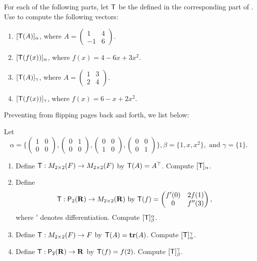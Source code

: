 \begin{exercise} \label{exercise 2.3.4}
For each of the following parts, let \(\textsf{T}\) be the \LTRAN{} defined in the corresponding part of .
Use  to compute the following vectors:

\begin{enumerate}
\item \([\textsf{T}(A)]_{\alpha}\), where \(A = \begin{pmatrix} 1 & 4 \\ -1 & 6 \end{pmatrix}\).
\item \([\textsf{T}(f(x))]_{\alpha}\), where \(f(x) = 4 - 6x + 3x^2\).
\item \([\textsf{T}(A)]_{\gamma}\), where \(A = \begin{pmatrix} 1 & 3 \\ 2 & 4 \end{pmatrix}\).
\item \([\textsf{T}(f(x))]_{\gamma}\), where \(f(x) = 6 - x + 2x^2\).
\end{enumerate}

\end{exercise}

\begin{note}
Preventing from flipping pages back and forth, we list  below:

Let
\[
    \alpha = \bigg\{
                \begin{pmatrix} 1 & 0 \\ 0 & 0 \end{pmatrix},
                \begin{pmatrix} 0 & 1 \\ 0 & 0 \end{pmatrix},
                \begin{pmatrix} 0 & 0 \\ 1 & 0 \end{pmatrix},
                \begin{pmatrix} 0 & 0 \\ 0 & 1 \end{pmatrix}
            \bigg\},
    \beta = \{ 1, x, x^{2} \},
    \text { and }
    \gamma = \{ 1 \}.
\]
\begin{enumerate}
\item Define \(\textsf{T} : M_{2 \times 2}(F) \to M_{2 \times 2}(F)\) by \(\textsf{T}(A) = A^\top\).
Compute \([\textsf{T}]_{\alpha}\).
\item Define
\[
    \textsf{T}: \textsf{P}_2(\mathbf{R}) \to M_{2 \times 2}(\mathbf{R}) \text{ by }
    \textsf{T}(f) = \begin{pmatrix} f'(0) & 2f(1) \\ 0 & f''(3) \end{pmatrix},
\]
where \('\) denotes differentiation.
Compute \([\textsf{T}]_{\beta}^{\alpha}\).
\item Define \(\textsf{T}: M_{2 \times 2}(F) \to F\) by \(\textsf{T}(A) = \textbf{tr}(A)\).
Compute \([\textsf{T}]_{\alpha}^{\gamma}\).
\item Define \(\textsf{T}: \textsf{P}_2(\mathbf{R}) \to \mathbf{R}\) by \(\textsf{T}(f) = f(2)\). 
Compute \([\textsf{T}]_{\beta}^{\gamma}\).
\end{enumerate}
\end{note}

